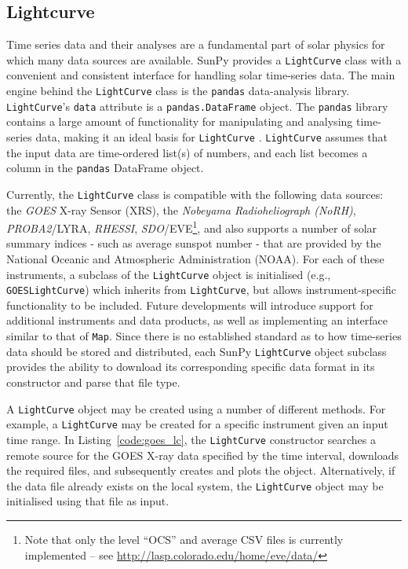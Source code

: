 \subsection{Lightcurve}\label{ssec:lightcurve}

Time series data and their analyses are a fundamental part of solar
physics for which many data sources are available.
SunPy provides a \texttt{LightCurve} class
with a convenient and consistent interface for handling solar time-series
data.  The main engine behind the \texttt{LightCurve} class is
the {\texttt{pandas}} data-analysis library.  
\texttt{LightCurve}'s \texttt{data} attribute is a \texttt{pandas.DataFrame} 
object. The \texttt{pandas} library contains a large amount
of functionality for manipulating and analysing time-series data,
making it an ideal basis for \texttt{LightCurve} \citep{mckinney2012}.  \texttt{LightCurve}
assumes that the input data are time-ordered list(s) of numbers, and each
list becomes a column in the \texttt{pandas} DataFrame object.

Currently, the \texttt{LightCurve} class is compatible with the
following data sources: the \textit{GOES} X-ray Sensor (XRS), the \textit{Nobeyama Radioheliograph (NoRH)}, \textit{PROBA2}/LYRA, \textit{RHESSI}, \textit{SDO}/EVE\footnote{Note that only the level ``OCS'' and
average CSV files is currently implemented -- see \url{http://lasp.colorado.edu/home/eve/data/}}, and also supports a number of solar summary indices - such as average sunspot number - that are provided by the National Oceanic and Atmospheric Administration (NOAA).  For each of these instruments, a subclass of the
\texttt{LightCurve} object is initialised
(e.g., \texttt{GOESLightCurve}) which inherits from
\texttt{LightCurve}, but allows instrument-specific functionality to be
included.  Future developments will introduce support for additional
instruments and data products, as well as implementing an interface 
similar to that of \texttt{Map}.  Since there is no established standard
as to how time-series data should be stored and distributed, each SunPy 
\texttt{LightCurve} object subclass provides the ability to download its corresponding 
specific data format in its constructor and parse that file type.

A \texttt{LightCurve} object may be created using a number of different methods. 
For example, a \texttt{LightCurve} may be created for a specific instrument given
an input time range. In Listing~\ref{code:goes_lc}, 
the \texttt{LightCurve} constructor searches a remote source for the GOES X-ray 
data specified by the time interval, downloads the required files, and 
subsequently creates and plots the object. Alternatively, if the data file 
already exists on the local system, the \texttt{LightCurve} object may be 
initialised using that file as input.

